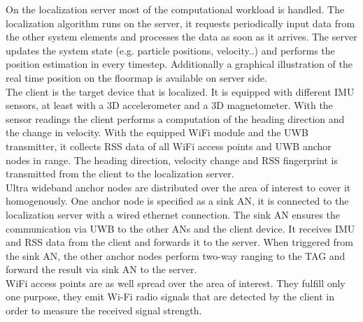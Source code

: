 \noindent\hspace*{5mm}%
On the localization server most of the computational workload is handled. The localization algorithm runs on the server, it requests periodically input data from the other system elements and processes the data as soon as it arrives. The server updates the system state (e.g. particle positions, velocity..) and performs the position estimation in every timestep. Additionally a graphical illustration of the real time position on the floormap is available on server side. \\
\noindent\hspace*{5mm}%
The client is the target device that is localized. It is equipped with different IMU sensors, at least with a 3D accelerometer and a 3D magnetometer. With the sensor readings the client performs a computation of the heading direction and the change in velocity. With the equipped WiFi module and the UWB transmitter, it collects RSS data of all WiFi access points and UWB anchor nodes in range. The heading direction, velocity change and RSS fingerprint is transmitted from the client to the localization server.\\
\noindent\hspace*{5mm}%
Ultra wideband anchor nodes are distributed over the area of interest to cover it homogenously. One anchor node is specified as a sink AN, it is connected to the localization server with a wired ethernet connection. The sink AN ensures the communication via UWB to the other ANs and the client device. It receives IMU and RSS data from the client and forwards it to the server. When triggered from the sink AN, the other anchor nodes perform two-way ranging to the TAG and forward the result via sink AN to the server.\\
\noindent\hspace*{5mm}%
WiFi access points are as well spread over the area of interest. They fulfill only one purpose, they emit Wi-Fi radio signals that are detected by the client in order to measure the received signal strength. 



